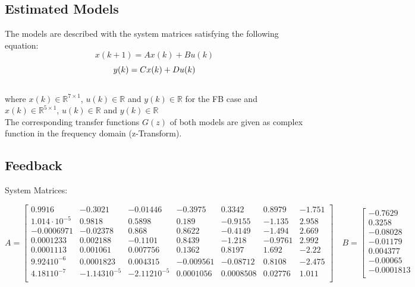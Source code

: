 \begin{landscape}
\chapter{Estimated Models}\label{sec:models}

The models are described with the system matrices satisfying the following equation:
\[x(k + 1) = Ax(k) + Bu(k)\]
\[y(k) = Cx(k) + Du(k)\\\]
\\
where $x(k) \in \mathbb{R}^{7\times1}$, $u(k) \in \mathbb{R}$ and $y(k) \in \mathbb{R}$ for the FB case and $x(k) \in \mathbb{R}^{5\times1}$, $u(k) \in \mathbb{R}$ and $y(k) \in \mathbb{R}$\\

The corresponding transfer functions $G(z) $ of both models are given as complex function in the frequency domain (z-Transform).

\section{Feedback}

System Matrices:
 
\[A = \left[ \begin{array}{ccccccc}

        0.9916  &   -0.3021  &  -0.01446  &   -0.3975  &    0.3342  &    0.8979   &   -1.751\\
    1.014\cdot10^{-5} &     0.9818   &   0.5898   &    0.189  &   -0.9155   &   -1.135   &    2.958\\
    -0.0006971 &   -0.02378  &     0.868   &   0.8622  &   -0.4149  &    -1.494   &    2.669\\
    0.0001233  &  0.002188   &  -0.1101  &    0.8439  &    -1.218  &   -0.9761    &   2.992\\
      0.0001113 &   0.001061 &   0.007756   &   0.1362  &    0.8197   &    1.692    &   -2.22\\
      9.92410^{-6} &  0.0001823 &   0.004315  &  -0.009561 &   -0.08712  &    0.8108   &   -2.475\\
     4.18110^{-7} & -1.14310^{-5} & -2.11210^{-5}  &  0.0001056 &  0.0008508  &   0.02776  &     1.011\\

\end{array} \right] \quad B = \left[ \begin{array}{c}

       -0.7629\\
      0.3258\\
       -0.08028\\
       -0.01179\\
      0.004377\\
      -0.00065\\
     -0.0001813\\


\end{array}\]
\end{landscape}
